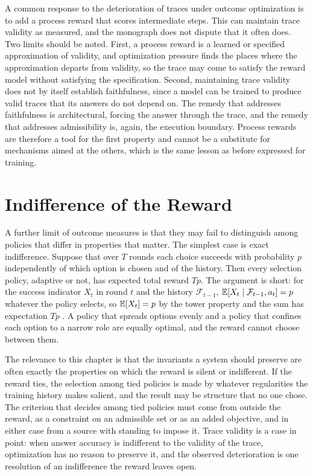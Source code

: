 A common response to the deterioration of traces under outcome optimization is to add a process reward that scores intermediate steps. This can maintain trace validity as measured, and the monograph does not dispute that it often does. Two limits should be noted. First, a process reward is a learned or specified approximation of validity, and optimization pressure finds the places where the approximation departs from validity, so the trace may come to satisfy the reward model without satisfying the specification. Second, maintaining trace validity does not by itself establish faithfulness, since a model can be trained to produce valid traces that its answers do not depend on. The remedy that addresses faithfulness is architectural, forcing the answer through the trace, and the remedy that addresses admissibility is, again, the execution boundary. Process rewards are therefore a tool for the first property and cannot be a substitute for mechanisms aimed at the others, which is the same lesson as before expressed for training.

\section{Indifference of the Reward}

A further limit of outcome measures is that they may fail to distinguish among policies that differ in properties that matter. The simplest case is exact indifference. Suppose that over $T$ rounds each choice succeeds with probability $p$ independently of which option is chosen and of the history. Then every selection policy, adaptive or not, has expected total reward $Tp$. The argument is short: for the success indicator $X_t$ in round $t$ and the history $\mathcal F_{t-1}$, $\mathbb{E}[X_t\mid\mathcal F_{t-1},a_t]=p$ whatever the policy selects, so $\mathbb{E}[X_t]=p$ by the tower property and the sum has expectation $Tp$ \cite{flyxion2026}. A policy that spreads options evenly and a policy that confines each option to a narrow role are equally optimal, and the reward cannot choose between them.

The relevance to this chapter is that the invariants a system should preserve are often exactly the properties on which the reward is silent or indifferent. If the reward ties, the selection among tied policies is made by whatever regularities the training history makes salient, and the result may be structure that no one chose. The criterion that decides among tied policies must come from outside the reward, as a constraint on an admissible set or as an added objective, and in either case from a source with standing to impose it. Trace validity is a case in point: when answer accuracy is indifferent to the validity of the trace, optimization has no reason to preserve it, and the observed deterioration is one resolution of an indifference the reward leaves open.

